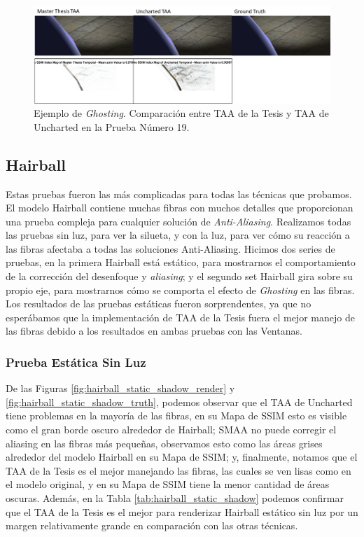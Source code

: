 \documentclass[pregrado]{tesis-usb} %
\begin{document}
\begin{figure}[!htb]
	\centering
	\includegraphics[scale=0.8]{images/results/sphere_ghosting.png}
	\caption{Ejemplo de \textit{Ghosting}. Comparación  entre TAA de la Tesis y TAA de Uncharted en la Prueba Número 19.}\label{fig:sphere_ghosting}
\end{figure}

\FloatBarrier

\subsection{Hairball}
Estas pruebas fueron las más complicadas para todas las técnicas que probamos. El modelo Hairball contiene muchas fibras con muchos detalles que proporcionan una prueba compleja para cualquier solución de \textit{Anti-Aliasing}. Realizamos todas las pruebas sin luz, para ver la silueta, y con la luz, para ver cómo su reacción a las fibras afectaba a todas las soluciones Anti-Aliasing. Hicimos dos series de pruebas, en la primera Hairball está estático, para mostrarnos el comportamiento de la corrección del desenfoque y \textit{aliasing}; y el segundo set Hairball gira sobre su propio eje, para mostrarnos cómo se comporta el efecto de \textit{Ghosting} en las fibras. Los resultados de las pruebas estáticas fueron sorprendentes, ya que no esperábamos que la implementación de TAA de la Tesis fuera el mejor manejo de las fibras debido a los resultados en ambas pruebas con las Ventanas.
\subsubsection{Prueba Estática Sin Luz}
De las Figuras \ref{fig:hairball_static_shadow_render} y \ref{fig:hairball_static_shadow_truth}, podemos observar que el TAA de Uncharted tiene problemas en la mayoría de las fibras, en su Mapa de SSIM esto es visible como el gran borde oscuro alrededor de Hairball; SMAA no puede corregir el aliasing en las fibras más pequeñas, observamos esto como las áreas grises alrededor del modelo Hairball en su Mapa de SSIM; y, finalmente, notamos que el TAA de la Tesis es el mejor manejando las fibras, las cuales se ven lisas como en el modelo original, y en su Mapa de SSIM tiene la menor cantidad de áreas oscuras. Además, en la Tabla \ref{tab:hairball_static_shadow} podemos confirmar que el TAA de la Tesis es el mejor para renderizar Hairball estático sin luz por un margen relativamente grande en comparación con las otras técnicas.
\end{document}
